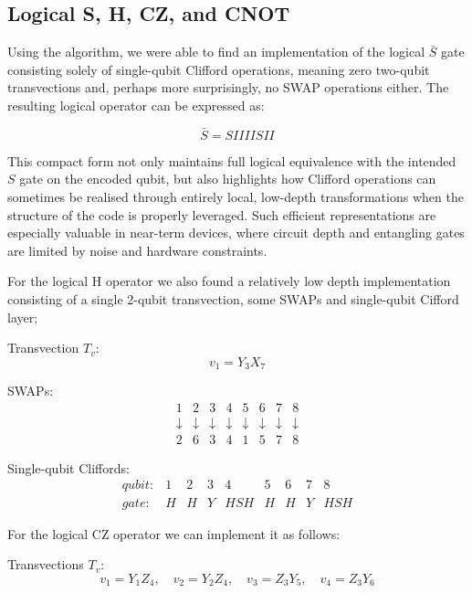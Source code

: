 \subsection{Logical S, H, CZ, and CNOT}
Using the algorithm, we were able to find an implementation of the logical \(\bar{S}\) gate consisting solely of single-qubit Clifford operations, meaning zero two-qubit transvections and, perhaps more surprisingly, no SWAP operations either. The resulting logical operator can be expressed as:

\begin{equation}
    \bar{S} = SIIIISII
\end{equation}

This compact form not only maintains full logical equivalence with the intended \(S\) gate on the encoded qubit, but also highlights how Clifford operations can sometimes be realised through entirely local, low-depth transformations when the structure of the code is properly leveraged. Such efficient representations are especially valuable in near-term devices, where circuit depth and entangling gates are limited by noise and hardware constraints.

For the logical H operator we also found a relatively low depth implementation consisting of a single 2-qubit transvection, some SWAPs and single-qubit Cifford layer;

Transvection \(T_v\):
\begin{equation}
    v_1 = Y_3X_7
\end{equation}

SWAPs:
\[
\begin{array}{cccccccc}
1 & 2 & 3 & 4 & 5 & 6 & 7 & 8 \\
\downarrow & \downarrow & \downarrow & \downarrow & \downarrow & \downarrow & \downarrow & \downarrow \\
2 & 6 & 3 & 4 & 1 & 5 & 7 & 8
\end{array}
\]

Single-qubit Cliffords:
\[
\begin{array}{ccccccccc}
qubit: & 1 & 2 & 3 & 4 & 5 & 6 & 7 & 8 \\
gate: & H & H & Y & HSH & H & H & Y & HSH
\end{array}
\]

For the logical CZ operator we can implement it as follows:

Transvections \(T_v\):
\begin{equation}
    v_1 = Y_1Z_4, \quad v_2=Y_2Z_4, \quad v_3=Z_3Y_5, \quad v_4=Z_3Y_6
\end{equation}

